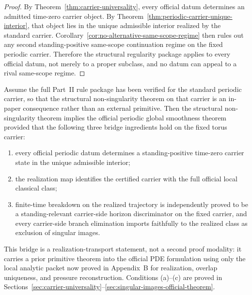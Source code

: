 \begin{proof}
By Theorem~\ref{thm:carrier-universality}, every official datum determines an admitted
time-zero carrier object. By Theorem~\ref{thm:periodic-carrier-unique-interior}, that object lies in
the unique admissible interior realized by the standard carrier. Corollary~\ref{cor:no-alternative-same-scope-regime}
then rules out any second standing-positive same-scope continuation regime on the fixed periodic
carrier. Therefore the structural regularity package applies to every official datum, not merely to a
proper subclass, and no datum can appeal to a rival same-scope regime.
\end{proof}


\begin{lemma}\label{lem:bridge-sufficiency-partIII}
Assume the full Part~II rule package has been verified for the standard periodic carrier, so that the
structural non-singularity theorem on that carrier is an in-paper consequence rather than an external
primitive. Then the structural non-singularity theorem implies the official periodic global smoothness
theorem provided that the following three bridge ingredients hold on the fixed torus carrier:
\begin{enumerate}[label=(\alph*), leftmargin=2.2em]
\item every official periodic datum determines a standing-positive time-zero carrier state in the unique admissible interior;
\item the realization map identifies the certified carrier with the full official local classical class;
\item finite-time breakdown on the realized trajectory is independently proved to be a standing-relevant carrier-side horizon discriminator on the fixed carrier, and every carrier-side branch elimination imports faithfully to the realized class as exclusion of singular images.
\end{enumerate}
This bridge is a realization-transport statement, not a second proof modality: it carries a prior
primitive theorem into the official PDE formulation using only the local analytic packet now proved in
Appendix~B for realization, overlap uniqueness, and pressure reconstruction.
Conditions (a)--(c) are proved in Sections~\ref{sec:carrier-universality}--\ref{sec:singular-images-official-theorem}.
\end{lemma}

